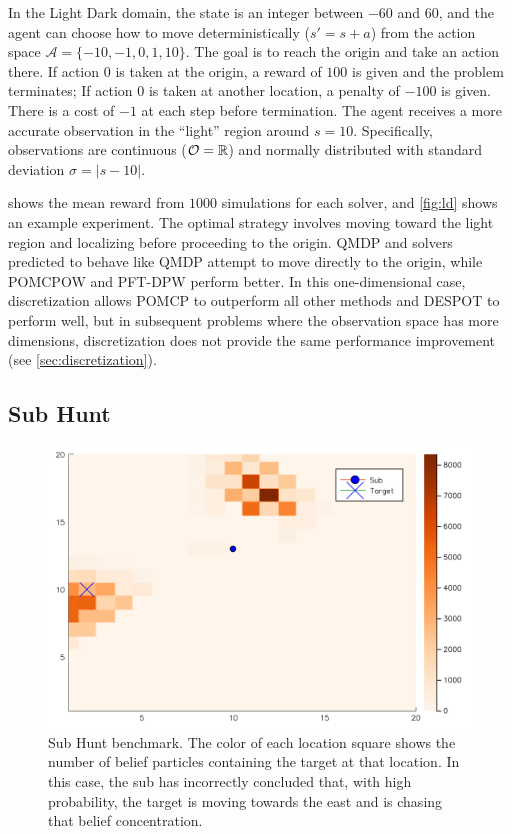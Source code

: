 In the Light Dark domain, the state is an integer between $-60$ and $60$, and the agent can choose how to move deterministically ($s' = s+a$) from the action space $\mathcal{A}=\{-10, -1, 0, 1, 10\}$. 
The goal is to reach the origin and take an action there.
If action $0$ is taken at the origin, a reward of $100$ is given and the problem terminates; If action $0$ is taken at another location, a penalty of $-100$ is given.
There is a cost of $-1$ at each step before termination.
The agent receives a more accurate observation in the ``light'' region around $s=10$.
Specifically, observations are continuous ($\mathcal{O}=\mathbb{R}$) and normally distributed with standard deviation $\sigma=|s-10|$.

 shows the mean reward from $1000$ simulations for each solver, and \cref{fig:ld} shows an example experiment.
The optimal strategy involves moving toward the light region and localizing before proceeding to the origin. 
QMDP and solvers predicted to behave like QMDP attempt to move directly to the origin, while POMCPOW and PFT-DPW perform better.
In this one-dimensional case, discretization allows POMCP to outperform all other methods and DESPOT to perform well, but in subsequent problems where the observation space has more dimensions, discretization does not provide the same performance improvement (see \cref{sec:discretization}).

\subsection{Sub Hunt}

\begin{figure}[htpb]
    \centering
    \includegraphics[width=0.6\linewidth]{media/subhunt.png}
    \caption[Sub Hunt problem]{Sub Hunt benchmark. The color of each location square shows the number of belief particles containing the target at that location. In this case, the sub has incorrectly concluded that, with high probability, the target is moving towards the east and is chasing that belief concentration.}
    \label{fig:subhunt}
\end{figure}


